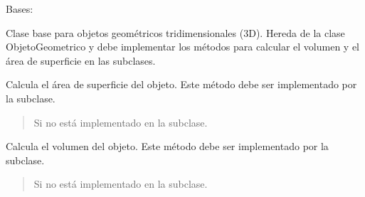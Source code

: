 \documentclass[letterpaper,10pt,spanish]{sphinxmanual}
\begin{document}

\begin{fulllineitems}
\label{\detokenize{pr8:pr8.4.Objeto3D}}
\pysigstartsignatures
{}
\pysigstopsignatures
\sphinxAtStartPar
Bases: {\hyperref[\detokenize{pr8:pr8.4.ObjetoGeometrico}]{}}

\sphinxAtStartPar
Clase base para objetos geométricos tridimensionales (3D).
Hereda de la clase ObjetoGeometrico y debe implementar los métodos
para calcular el volumen y el área de superficie en las subclases.

\begin{fulllineitems}
\label{\detokenize{pr8:pr8.4.Objeto3D.area_superficie}}
\pysigstartsignatures
{}
\pysigstopsignatures
\sphinxAtStartPar
Calcula el área de superficie del objeto. Este método debe ser implementado por la subclase.
\begin{quote}\begin{description}
\sphinxAtStartPar
{} \textendash{} Si no está implementado en la subclase.

\end{description}\end{quote}

\end{fulllineitems}


\begin{fulllineitems}
\label{\detokenize{pr8:pr8.4.Objeto3D.volumen}}
\pysigstartsignatures
{}
\pysigstopsignatures
\sphinxAtStartPar
Calcula el volumen del objeto. Este método debe ser implementado por la subclase.
\begin{quote}\begin{description}
\sphinxAtStartPar
{} \textendash{} Si no está implementado en la subclase.

\end{description}\end{quote}

\end{fulllineitems}


\end{fulllineitems}
\end{document}
